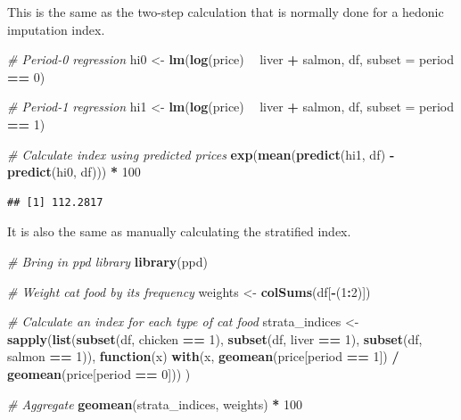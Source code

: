 \documentclass[]{article}
\newenvironment{Shaded}{\begin{snugshade}}{\end{snugshade}}
\newcommand{\CommentTok}[1]{\textcolor[rgb]{0.56,0.35,0.01}{\textit{#1}}}
\newcommand{\ControlFlowTok}[1]{\textcolor[rgb]{0.13,0.29,0.53}{\textbf{#1}}}
\newcommand{\DataTypeTok}[1]{\textcolor[rgb]{0.13,0.29,0.53}{#1}}
\newcommand{\DecValTok}[1]{\textcolor[rgb]{0.00,0.00,0.81}{#1}}
\newcommand{\KeywordTok}[1]{\textcolor[rgb]{0.13,0.29,0.53}{\textbf{#1}}}
\newcommand{\NormalTok}[1]{#1}
\newcommand{\OperatorTok}[1]{\textcolor[rgb]{0.81,0.36,0.00}{\textbf{#1}}}
\newcommand{\StringTok}[1]{\textcolor[rgb]{0.31,0.60,0.02}{#1}}
\begin{document}
This is the same as the two-step calculation that is normally done for a hedonic imputation index.

\begin{Shaded}
\begin{Highlighting}[]
\CommentTok{# Period-0 regression}
\NormalTok{hi0 <-}\StringTok{ }\KeywordTok{lm}\NormalTok{(}\KeywordTok{log}\NormalTok{(price) }\OperatorTok{~}\StringTok{ }\NormalTok{liver }\OperatorTok{+}\StringTok{ }\NormalTok{salmon, df, }\DataTypeTok{subset =}\NormalTok{ period }\OperatorTok{==}\StringTok{ }\DecValTok{0}\NormalTok{)}

\CommentTok{# Period-1 regression}
\NormalTok{hi1 <-}\StringTok{ }\KeywordTok{lm}\NormalTok{(}\KeywordTok{log}\NormalTok{(price) }\OperatorTok{~}\StringTok{ }\NormalTok{liver }\OperatorTok{+}\StringTok{ }\NormalTok{salmon, df, }\DataTypeTok{subset =}\NormalTok{ period }\OperatorTok{==}\StringTok{ }\DecValTok{1}\NormalTok{)}

\CommentTok{# Calculate index using predicted prices}
\KeywordTok{exp}\NormalTok{(}\KeywordTok{mean}\NormalTok{(}\KeywordTok{predict}\NormalTok{(hi1, df) }\OperatorTok{-}\StringTok{ }\KeywordTok{predict}\NormalTok{(hi0, df))) }\OperatorTok{*}\StringTok{ }\DecValTok{100}
\end{Highlighting}
\end{Shaded}

\begin{verbatim}
## [1] 112.2817
\end{verbatim}

It is also the same as manually calculating the stratified index.

\begin{Shaded}
\begin{Highlighting}[]
\CommentTok{# Bring in ppd library}
\KeywordTok{library}\NormalTok{(ppd)}

\CommentTok{# Weight cat food by its frequency}
\NormalTok{weights <-}\StringTok{ }\KeywordTok{colSums}\NormalTok{(df[}\OperatorTok{-}\NormalTok{(}\DecValTok{1}\OperatorTok{:}\DecValTok{2}\NormalTok{)])}

\CommentTok{# Calculate an index for each type of cat food}
\NormalTok{strata_indices <-}\StringTok{ }
\StringTok{  }\KeywordTok{sapply}\NormalTok{(}\KeywordTok{list}\NormalTok{(}\KeywordTok{subset}\NormalTok{(df, chicken }\OperatorTok{==}\StringTok{ }\DecValTok{1}\NormalTok{), }
              \KeywordTok{subset}\NormalTok{(df, liver }\OperatorTok{==}\StringTok{ }\DecValTok{1}\NormalTok{), }
              \KeywordTok{subset}\NormalTok{(df, salmon }\OperatorTok{==}\StringTok{ }\DecValTok{1}\NormalTok{)),}
         \ControlFlowTok{function}\NormalTok{(x) }\KeywordTok{with}\NormalTok{(x, }\KeywordTok{geomean}\NormalTok{(price[period }\OperatorTok{==}\StringTok{ }\DecValTok{1}\NormalTok{]) }\OperatorTok{/}\StringTok{ }\KeywordTok{geomean}\NormalTok{(price[period }\OperatorTok{==}\StringTok{ }\DecValTok{0}\NormalTok{]))}
\NormalTok{         )}

\CommentTok{# Aggregate}
\KeywordTok{geomean}\NormalTok{(strata_indices, weights) }\OperatorTok{*}\StringTok{ }\DecValTok{100}
\end{Highlighting}
\end{Shaded}
\end{document}
